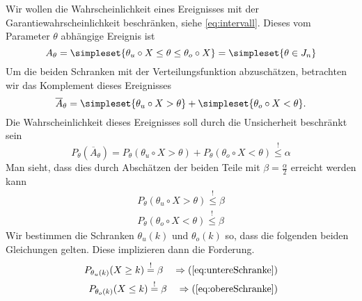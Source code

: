 Wir wollen die Wahrscheinlichkeit eines Ereignisses mit der Garantiewahrscheinlichkeit beschränken, siehe \autoref{eq:intervall}. Dieses vom Parameter $\theta$ abhängige Ereignis ist
\begin{equation*}
	A_\theta = \simpleset{\theta_u\circ X\leq \theta\leq \theta_o\circ X} = \simpleset{\theta\in J_n}
\end{equation*}
Um die beiden Schranken mit der Verteilungsfunktion abzuschätzen, betrachten wir das Komplement dieses Ereignisses
\begin{equation*}
	\overline A_\theta =\simpleset{\theta_u\circ X > \theta}+\simpleset{\theta_o\circ X< \theta}.
\end{equation*}
Die Wahrscheinlichkeit dieses Ereignisses soll durch die Unsicherheit beschränkt sein
\begin{equation*}
	P_\theta(\overline A_\theta) = P_\theta(\theta_u\circ X > \theta)+P_\theta(\theta_o\circ X< \theta)\overset!\leq\alpha
\end{equation*}
Man sieht, dass dies durch Abschätzen der beiden Teile mit $\beta=\frac\alpha2$ erreicht werden kann
\begin{align}
	P_\theta(\theta_u\circ X > \theta)\overset!\leq \beta \label{eq:untereSchranke}\\
	P_\theta(\theta_o\circ X< \theta)\overset!\leq\beta \label{eq:obereSchranke}
\end{align}
Wir bestimmen die Schranken $\theta_u(k)$ und $\theta_o(k)$ so, dass die folgenden beiden Gleichungen gelten. Diese implizieren dann die Forderung.
\begin{align*}
	P_{\theta_u(k)}(X\geq k)\overset!=\beta\quad\Rightarrow (\ref{eq:untereSchranke})\\
	P_{\theta_o(k)}(X\leq k)\overset!=\beta\quad\Rightarrow (\ref{eq:obereSchranke})
\end{align*}

